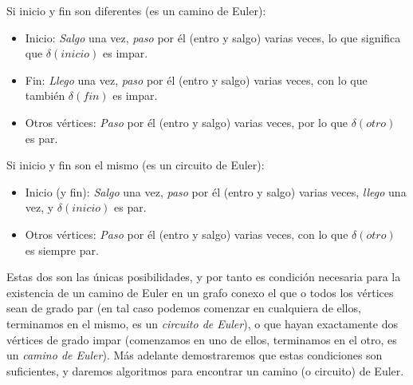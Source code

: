   Si inicio y fin son diferentes
  (es un camino de Euler):
  \begin{itemize}
  \item
    Inicio:
    \emph{Salgo} una vez,
    \emph{paso} por él (entro y salgo) varias veces,
    lo que significa que \(\delta(\mathit{inicio})\) es impar.
  \item
    Fin:
    \emph{Llego} una vez,
    \emph{paso} por él (entro y salgo) varias veces,
    con lo que también \(\delta(\mathit{fin})\) es impar.
  \item
    Otros vértices:
    \emph{Paso} por él (entro y salgo) varias veces,
    por lo que \(\delta(\mathit{otro})\) es par.
  \end{itemize}
  Si inicio y fin son el mismo
  (es un circuito de Euler):
  \begin{itemize}
  \item
    Inicio (y fin):
    \emph{Salgo} una vez,
    \emph{paso} por él (entro y salgo) varias veces,
    \emph{llego} una vez,
    y \(\delta(\mathit{inicio})\) es par.
  \item
    Otros vértices:
    \emph{Paso} por él (entro y salgo) varias veces,
    con lo que \(\delta(\mathit{otro})\) es siempre par.
  \end{itemize}
  Estas dos son las únicas posibilidades,
  y por tanto es condición necesaria
  para la existencia de un camino de Euler
  en un grafo conexo el que o todos los vértices sean de grado par
  (en tal caso podemos comenzar en cualquiera de ellos,
  terminamos en el mismo,
  es un \emph{circuito de Euler}),
  o que hayan exactamente dos vértices de grado impar
  (comenzamos en uno de ellos,
  terminamos en el otro,
  es un \emph{camino de Euler}).
  Más adelante demostraremos que estas condiciones son suficientes,
  y daremos algoritmos
  para encontrar un camino (o circuito) de Euler.

